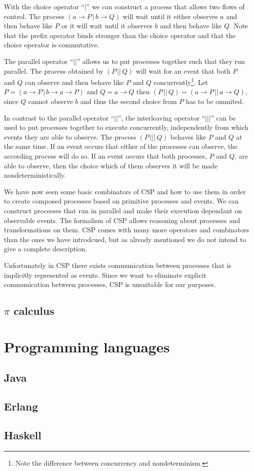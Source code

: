 With the choice operator \enquote{$|$} we can construct a process that allows two flows of control. The process $\left( a \to P \,|\, b \to Q \right)$ will wait until it either observes $a$ and then behave like $P$ or it will wait until it observes $b$ and then behave like $Q$. Note that the prefix operator binds stronger than the choice operator and that the choice operator is commutative.

The parallel operator \enquote{$||$} allows us to put processes together such that they run parallel. The process obtained by $\left( P \,||\, Q \right)$ will wait for an event that both $P$ and $Q$ can observe and then behave like $P$ and $Q$ concurrently\footnote{Note the difference between concurrency and nondeterminism.}. Let $P = \left( a \to P \,|\, b \to a \to P \right)$ and $Q = a \to Q$ then $\left( P \,||\, Q \right) = \left( a \to P \,||\, a \to Q \right)$, since $Q$ cannot observe $b$ and thus the second choice from $P$ has to be ommited.

In contrast to the parallel operator \enquote{$||$}, the interleaving operator \enquote{$|||$} can be used to put processes together to execute concurrently, independently from which events they are able to observe. The process $\left( P \,|||\, Q \right)$ behaves like $P$ and $Q$ at the same time. If an event occurs that either of the processes can observe, the according process will do so. If an event occurs that both processes, $P$ and $Q$, are able to observe, then the choice which of them observes it will be made nondeterministically.

We have now seen some basic combinators of \textsc{CSP} and how to use them in order to create composed processes based on primitive processes and events. We can construct processes that run in parallel and make their execution dependant on observable events. The formalism of \textsc{CSP} allows reasoning about processes and transformations on them. \textsc{CSP} comes with many more operators and combinators than the ones we have introdcued, but as already mentioned we do not intend to give a complete description.

Unfortunately in \textsc{CSP} there exists communication between processes that is implicitly represented as events. Since we want to eliminate explicit communication between processes, \textsc{CSP} is unsuitable for our purposes.

\subsection{$\pi$ calculus}

\section{Programming languages}

\subsection{Java}

\subsection{Erlang}

\subsection{Haskell}